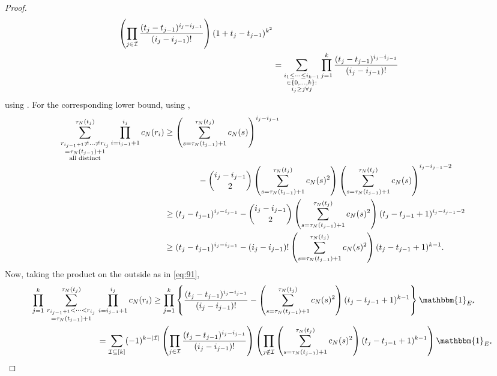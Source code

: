 \documentclass{article}
\newcommand{\1}[1]{\mathbbm{1}_{#1}}
\begin{document}
\begin{proof}
\begin{align}
\left( \prod_{j\in\mathcal{I}} \frac{(t_j - t_{j-1})^{i_j - i_{j-1}}}{(i_j - i_{j-1})!}\right) 
(1+ t_j - t_{j-1})^{k^2} \notag\\
&= \sum_{\substack{i_1\leq \dots\leq i_{k-1}\\ \in \{0,\dots,k\} :\\ i_j \geq j \forall j}} \prod_{j=1}^k \frac{(t_j - t_{j-1})^{i_j - i_{j-1}}}{(i_j - i_{j-1})!}
\end{align}
using \citet[Equation (3.3)]{brown2021}.
For the corresponding lower bound, using \citet[(8)]{koskela2018},
\begin{align}
\sum_{\substack{ r_{i_{j-1}+1} \neq \dots \neq r_{i_j} \\ = \tau_N(t_{j-1})+1 \\ \text{all distinct}}}^{\tau_N(t_j)}
\prod_{i=i_{j-1}+1}^{i_j} c_N(r_i)
&\geq \left( \sum_{s=\tau_N(t_{j-1})+1}^{\tau_N(t_j)} c_N(s) \right)^{i_j - i_{j-1}} \notag\\
&\qquad\qquad- \binom{i_j - i_{j-1}}{2} \left( \sum_{s=\tau_N(t_{j-1})+1}^{\tau_N(t_j)} c_N(s)^2 \right)
\left( \sum_{s=\tau_N(t_{j-1})+1}^{\tau_N(t_j)} c_N(s) \right)^{i_j - i_{j-1} -2} \notag\\
&\geq (t_j - t_{j-1})^{i_j - i_{j-1}}
- \binom{i_j - i_{j-1}}{2} \left( \sum_{s=\tau_N(t_{j-1})+1}^{\tau_N(t_j)} c_N(s)^2 \right)
( t_j - t_{j-1} +1 )^{i_j - i_{j-1} -2} \notag\\
&\geq (t_j - t_{j-1})^{i_j - i_{j-1}}
- (i_j - i_{j-1})! \left( \sum_{s=\tau_N(t_{j-1})+1}^{\tau_N(t_j)} c_N(s)^2 \right)
( t_j - t_{j-1} +1 )^{k-1} .
\end{align}
Now, taking the product on the outside as in \eqref{eq:91}, 
\begin{align}
\prod_{j=1}^k \,
\sum_{\substack{ r_{i_{j-1}+1} < \dots < r_{i_j} \\ = \tau_N(t_{j-1})+1}}^{\tau_N(t_j)}  \,&\prod_{i=i_{j-1}+1}^{i_j} c_N(r_i)
\geq \prod_{j=1}^k \left\{ \frac{(t_j - t_{j-1})^{i_j - i_{j-1}}}{(i_j - i_{j-1})!}  
- \left( \sum_{s=\tau_N(t_{j-1})+1}^{\tau_N(t_j)} c_N(s)^2 \right)
( t_j - t_{j-1} +1 )^{k-1} \right\} \1{E^\star} \notag\\
&= \sum_{\mathcal{I} \subseteq [k]} (-1)^{k-|\mathcal{I}|} \left( \prod_{j\in\mathcal{I}} \frac{(t_j - t_{j-1})^{i_j - i_{j-1}}}{(i_j - i_{j-1})!} \right)
\left( \prod_{j\notin\mathcal{I}} \left( \sum_{s=\tau_N(t_{j-1})+1}^{\tau_N(t_j)} c_N(s)^2 \right) ( t_j - t_{j-1} +1 )^{k-1} \right) \1{E^\star} \notag\\

\end{align}
\end{proof}
\end{document}
